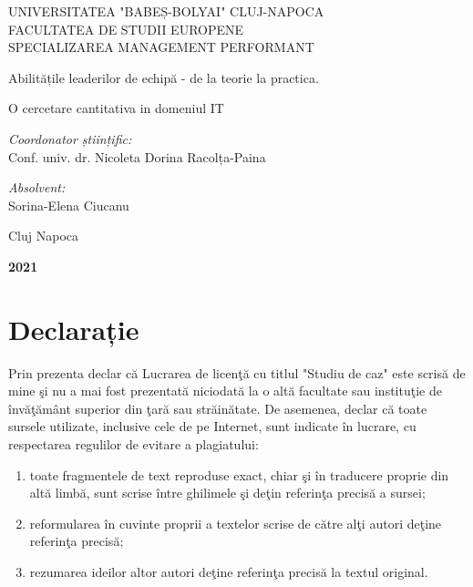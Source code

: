 \documentclass[a4paper, 12pt]{article}
\begin{document}
\begin{titlepage}
	\begin{center}
		\vspace{0.5cm}
		\large {UNIVERSITATEA "BABEȘ-BOLYAI" CLUJ-NAPOCA}
		\\
		\large {FACULTATEA DE STUDII EUROPENE}
		\\\large {SPECIALIZAREA MANAGEMENT PERFORMANT}
		
		\vspace{2.75cm}
		
	
		\huge Abilitățile leaderilor de echipă - de la teorie la practica. 
		
		\huge O cercetare cantitativa  in domeniul IT
		\vspace{1.5 cm}
		
		\vfill
	\end{center}
	
	\begin{flushleft}
		\large{\textit{Coordonator științific:}} \\
		\large{Conf. univ. dr. Nicoleta Dorina Racolța-Paina}
	\end{flushleft}
	
	\begin{flushright}
		\hfill \large {\textit{Absolvent:}} \\
		\hfill \large {Sorina-Elena Ciucanu}
	\end{flushright}
	
	\begin{center}
		\vspace{1.5cm}
		\Large{Cluj Napoca}
		
		\large \textbf{2021}
	\end{center}
\end{titlepage}
\restoregeometry
\thispagestyle{empty}
\section*{Declarație}
\bigskip
\qquad Prin prezenta declar că Lucrarea de licenţă cu titlul "Studiu de caz" este scrisă de mine şi nu a mai fost prezentată niciodată la o altă facultate sau instituţie de învăţământ superior din ţară sau străinătate. De asemenea, declar că toate sursele utilizate, inclusive cele de pe Internet, sunt indicate în lucrare, cu respectarea regulilor de evitare a plagiatului:
	\begin{enumerate}[-]
	\item toate fragmentele de text reproduse exact, chiar şi în traducere proprie din altă limbă, sunt scrise între ghilimele şi deţin referinţa precisă a sursei;
	\item reformularea în cuvinte proprii a textelor scrise de către alţi autori deţine referinţa precisă;
	\item rezumarea ideilor altor autori deţine referinţa precisă la textul original.
	\end{enumerate}
\end{document}

